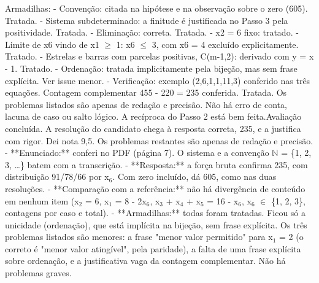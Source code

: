 \documentclass{article}%
\begin{document}
\newline%
Armadilhas:\newline%
{-} Convenção: citada na hipótese e na observação sobre o zero (605). Tratada.\newline%
{-} Sistema subdeterminado: a finitude é justificada no Passo 3 pela positividade. Tratada.\newline%
{-} Eliminação: correta. Tratada.\newline%
{-} x2 = 6 fixo: tratado.\newline%
{-} Limite de x6 vindo de x1 $\geq$ 1: x6 $\leq$ 3, com x6 = 4 excluído explicitamente. Tratado.\newline%
{-} Estrelas e barras com parcelas positivas, C(m-1,2): derivado com y = x - 1. Tratado.\newline%
{-} Ordenação: tratada implicitamente pela bijeção, mas sem frase explícita. Ver issue menor.\newline%
{-} Verificação: exemplo (2,6,1,1,11,3) conferido nas três equações. Contagem complementar 455 - 220 = 235 conferida. Tratada.\newline%
\newline%
Os problemas listados são apenas de redação e precisão. Não há erro de conta, lacuna de caso ou salto lógico. A recíproca do Passo 2 está bem feita.Avaliação concluída. A resolução do candidato chega à resposta correta, 235, e a justifica com rigor. Dei nota 9,5. Os problemas restantes são apenas de redação e precisão.\newline%
\newline%
{-} **Enunciado:** conferi no PDF (página 7). O sistema e a convenção $\mathbb{N}$ = \{1, 2, 3, \ldots{}\} batem com a transcrição.\newline%
{-} **Resposta:** a força bruta confirma 235, com distribuição 91/78/66 por x$_{6}$. Com zero incluído, dá 605, como nas duas resoluções.\newline%
{-} **Comparação com a referência:** não há divergência de conteúdo em nenhum item (x$_{2}$ = 6, x$_{1}$ = 8 - 2x$_{6}$, x$_{3}$ + x$_{4}$ + x$_{5}$ = 16 - x$_{6}$, x$_{6}$ $\in$ \{1, 2, 3\}, contagens por caso e total).\newline%
{-} **Armadilhas:** todas foram tratadas. Ficou só a unicidade (ordenação), que está implícita na bijeção, sem frase explícita.\newline%
\newline%
Os três problemas listados são menores: a frase "menor valor permitido" para x$_{1}$ = 2 (o correto é "menor valor atingível", pela paridade), a falta de uma frase explícita sobre ordenação, e a justificativa vaga da contagem complementar. Não há problemas graves.\newline%
\end{document}
